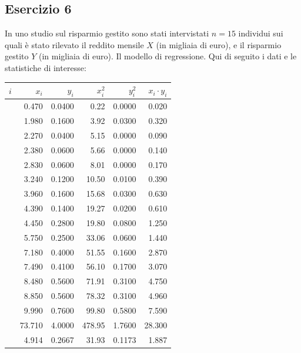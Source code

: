 \documentclass[
  11pt,
]{book}
\theoremstyle{mytheoremstyle}
\theoremstyle{mydefstyle}
\begin{document}
\subsection{Esercizio 6}\label{esercizio-6-5}

In uno studio sul risparmio gestito sono stati intervistati \(n=15\) individui
sui quali è stato rilevato il reddito mensile \(X\) (in migliaia di euro), e il risparmio gestito \(Y\) (in migliaia di euro). Il modello di regressione. Qui di seguito i dati e le statistiche di interesse:

\begin{table}[H]
\centering
\begin{tabular}{>{\raggedright\arraybackslash}p{3em}rrrrr}
\toprule
$i$ & $x_i$ & $y_i$ & $x_i^2$ & $y_i^2$ & $x_i\cdot y_i$\\
\midrule
\cellcolor[HTML]{E6E6E6}{1} & 0.470 & 0.0400 & 0.22 & 0.0000 & 0.020\\
\cellcolor[HTML]{E6E6E6}{2} & 1.980 & 0.1600 & 3.92 & 0.0300 & 0.320\\
\cellcolor[HTML]{E6E6E6}{3} & 2.270 & 0.0400 & 5.15 & 0.0000 & 0.090\\
\cellcolor[HTML]{E6E6E6}{4} & 2.380 & 0.0600 & 5.66 & 0.0000 & 0.140\\
\cellcolor[HTML]{E6E6E6}{5} & 2.830 & 0.0600 & 8.01 & 0.0000 & 0.170\\
\cellcolor[HTML]{E6E6E6}{6} & 3.240 & 0.1200 & 10.50 & 0.0100 & 0.390\\
\cellcolor[HTML]{E6E6E6}{7} & 3.960 & 0.1600 & 15.68 & 0.0300 & 0.630\\
\cellcolor[HTML]{E6E6E6}{8} & 4.390 & 0.1400 & 19.27 & 0.0200 & 0.610\\
\cellcolor[HTML]{E6E6E6}{9} & 4.450 & 0.2800 & 19.80 & 0.0800 & 1.250\\
\cellcolor[HTML]{E6E6E6}{10} & 5.750 & 0.2500 & 33.06 & 0.0600 & 1.440\\
\cellcolor[HTML]{E6E6E6}{11} & 7.180 & 0.4000 & 51.55 & 0.1600 & 2.870\\
\cellcolor[HTML]{E6E6E6}{12} & 7.490 & 0.4100 & 56.10 & 0.1700 & 3.070\\
\cellcolor[HTML]{E6E6E6}{13} & 8.480 & 0.5600 & 71.91 & 0.3100 & 4.750\\
\cellcolor[HTML]{E6E6E6}{14} & 8.850 & 0.5600 & 78.32 & 0.3100 & 4.960\\
\cellcolor[HTML]{E6E6E6}{15} & 9.990 & 0.7600 & 99.80 & 0.5800 & 7.590\\
\cellcolor[HTML]{E6E6E6}{Totale} & 73.710 & 4.0000 & 478.95 & 1.7600 & 28.300\\
\cellcolor[HTML]{E6E6E6}{Totale/n} & 4.914 & 0.2667 & 31.93 & 0.1173 & 1.887\\
\bottomrule
\end{tabular}
\end{table}
\end{document}
